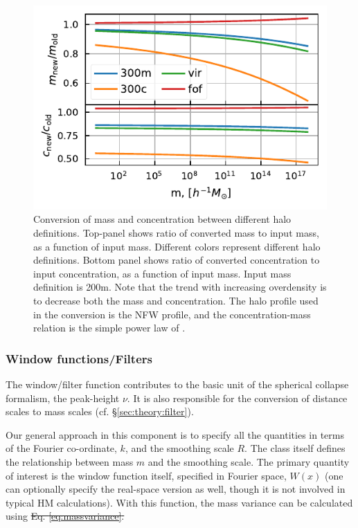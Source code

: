 \documentclass[5p,aas_macros]{elsarticle}
\providecommand{\DIFaddtex}[1]{{\protect\color{blue}\uwave{#1}}} %
\providecommand{\DIFdeltex}[1]{{\protect\color{red}\sout{#1}}}                      %
\providecommand{\DIFaddbegin}{} %
\providecommand{\DIFaddend}{} %
\providecommand{\DIFdelbegin}{} %
\providecommand{\DIFdelend}{} %
\providecommand{\DIFadd}[1]{\texorpdfstring{\DIFaddtex{#1}}{#1}} %
\providecommand{\DIFdel}[1]{\texorpdfstring{\DIFdeltex{#1}}{}} %
\begin{document}
\begin{figure}
  \centering
  \includegraphics[width=\linewidth]{mass_conversion.pdf}
  \caption[Mass conversion]{Conversion of mass and concentration between different halo definitions. Top-panel shows ratio of converted mass to input mass, as a function of input mass. Different colors represent different halo definitions. Bottom panel shows ratio of converted
  concentration to input concentration, as a function of input mass.
  Input mass definition is 200m. Note that the trend with increasing overdensity is to decrease both the mass and concentration. 
  The halo profile used in the conversion is the NFW profile, and the concentration-mass relation is the simple power law of \cite{Duffy2008}.}
  \label{fig:mass_conversion}
\end{figure}

\subsubsection{Window functions/Filters}
\label{sec:halomod:components:window}
The window/filter function contributes to the basic unit of the spherical collapse formalism, the peak-height $\nu$. It is also responsible for the conversion of distance scales to mass scales (cf. \S\ref{sec:theory:filter}).

Our general approach in this component is to specify all the quantities in terms of the Fourier co-ordinate, $k$, and the smoothing scale $R$. The class itself defines the relationship between mass $m$ and the smoothing scale. The primary quantity of interest is the window function itself, specified in Fourier space, $W(x)$ (one can optionally specify the real-space version as well, though it is not involved in typical HM calculations). With this function, the mass variance can be calculated using \DIFdelbegin \DIFdel{Eq. 
\ref{eq:massvariance}. 
}\DIFdelend \DIFaddbegin \DIFadd{\mbox{%
\cref{eq:massvariance}}\hspace{0pt}%
. 
}\DIFaddend 
\end{document}
